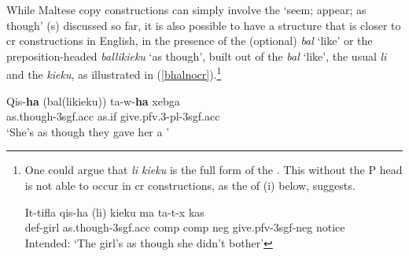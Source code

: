 \documentclass[output=paper]{LSP/langsci}
\begin{document}
While Maltese copy  constructions can simply involve the `seem; appear; as though' (s) discussed so far, it is also possible to have a structure that is closer to {\sc cr} constructions in English, in the presence of the (optional)  \emph{b\textcrh al} `like' or the preposition-headed  \emph{b\textcrh allikieku} `as though', built out of the  \emph{b\textcrh al} `like', the usual  \emph{li} and the  \emph{kieku}, as illustrated in (\ref{bhalnocr}).\footnote{One could argue that \emph{li kieku} is the full form of the . This  without the P head is not able to occur in {\sc cr} constructions, as the  of (i) below, suggests.

\ea 
\gll *It-tifla qis-ha (li) kieku ma ta-t-x kas\\
{\sc def-}girl as.though-{\sc 3sgf.acc} {\sc comp} {\sc comp} {\sc neg} give.{\sc pfv-3sgf-neg} notice\\
\glt Intended: `The girl's as though she didn't bother'
\z

} %

\ea \label{bhalnocr}
\gll Qis-{\bf{ha}} (b\textcrh al(likieku)) ta-w-{\bf{ha}} xebg\textcrh a\\
as.though-{\sc 3sgf.acc} as.if give.{\sc pfv.3-pl-3sgf.acc} \\
\glt `She's as though they gave her a '
\z

\end{document}
